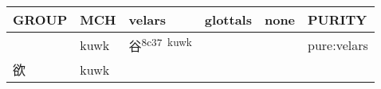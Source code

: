 \documentclass[14pt,a4paper]{scrartcl}
\begin{document}
\begin{longtable}[c]{@{}llllll@{}}
\toprule
\begin{minipage}[b]{0.14\columnwidth}\raggedright\strut
GROUP
\strut\end{minipage} &
\begin{minipage}[b]{0.14\columnwidth}\raggedright\strut
MCH
\strut\end{minipage} &
\begin{minipage}[b]{0.14\columnwidth}\raggedright\strut
velars
\strut\end{minipage} &
\begin{minipage}[b]{0.14\columnwidth}\raggedright\strut
glottals
\strut\end{minipage} &
\begin{minipage}[b]{0.14\columnwidth}\raggedright\strut
none
\strut\end{minipage} &
\begin{minipage}[b]{0.14\columnwidth}\raggedright\strut
PURITY
\strut\end{minipage}\tabularnewline
\midrule
\endhead
\begin{minipage}[t]{0.14\columnwidth}\raggedright\strut
𠔌
\strut\end{minipage} &
\begin{minipage}[t]{0.14\columnwidth}\raggedright\strut
kuwk
\strut\end{minipage} &
\begin{minipage}[t]{0.14\columnwidth}\raggedright\strut
谷\textsuperscript{8c37~kuwk}
\strut\end{minipage} &
\begin{minipage}[t]{0.14\columnwidth}\raggedright\strut
\strut\end{minipage} &
\begin{minipage}[t]{0.14\columnwidth}\raggedright\strut
\strut\end{minipage} &
\begin{minipage}[t]{0.14\columnwidth}\raggedright\strut
pure:velars
\strut\end{minipage}\tabularnewline
\begin{minipage}[t]{0.14\columnwidth}\raggedright\strut
欲
\strut\end{minipage} &
\begin{minipage}[t]{0.14\columnwidth}\raggedright\strut
kuwk
\strut\end{minipage} &
\begin{minipage}[t]{0.14\columnwidth}\raggedright\strut
\strut\end{minipage} &

\end{longtable}
\end{document}
